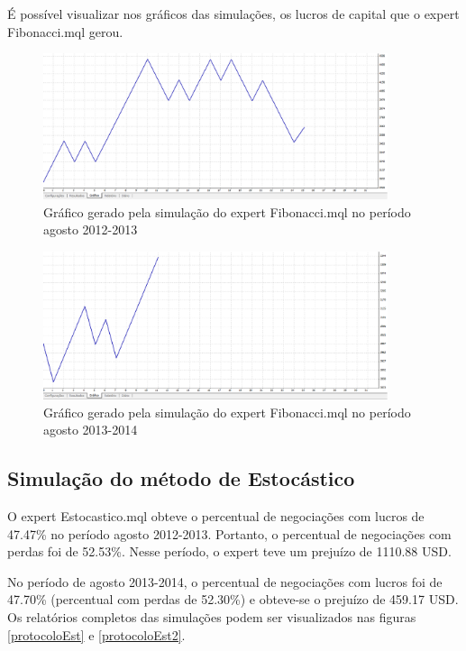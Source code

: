 É possível visualizar nos gráficos das simulações, os lucros de capital que o expert Fibonacci.mql gerou.

\begin{figure}[H]
\centering
\includegraphics[width=0.9\textwidth]{figuras/protocoloFib3}
\caption{Gráfico gerado pela simulação do expert Fibonacci.mql no período agosto 2012-2013}
\label{protocoloFib3}
\end{figure}

\begin{figure}[H]
\centering
\includegraphics[width=0.9\textwidth]{figuras/protocoloFib4}
\caption{Gráfico gerado pela simulação do expert Fibonacci.mql no período agosto 2013-2014}
\label{protocoloFib4}
\end{figure}

\subsection{Simulação do método de Estocástico}

O expert Estocastico.mql obteve o percentual de negociações com lucros de 47.47\% no período agosto 2012-2013. Portanto, o percentual de negociações com perdas foi de 52.53\%. Nesse período, o expert teve um prejuízo de 1110.88 USD.

No período de agosto 2013-2014, o percentual de negociações com lucros foi de 47.70\% (percentual com perdas de 52.30\%)  e obteve-se o prejuízo de 459.17 USD. 
Os relatórios completos das simulações podem ser visualizados nas figuras \ref{protocoloEst} e \ref{protocoloEst2}.

